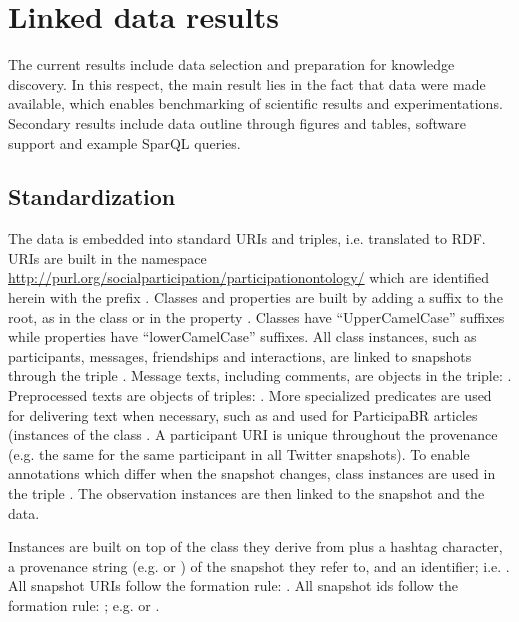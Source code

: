 \section{Linked data results}
\label{outline}
The current results include data selection and preparation for knowledge discovery.
In this respect, the main result lies in the fact that data were made available, which enables benchmarking of scientific results
and experimentations.
Secondary results include data outline through figures and tables,
software support and example SparQL queries.

\subsection{Standardization}
The data is embedded into standard URIs and triples, i.e. translated to RDF.
URIs are built in the namespace \url{http://purl.org/socialparticipation/participationontology/}
which are identified herein with the prefix .
Classes and properties are built by adding a suffix to the root,
as in the class  or in the property .
Classes have ``UpperCamelCase'' suffixes while properties have ``lowerCamelCase'' suffixes.
All class instances, such as participants, messages, friendships and
interactions, are linked to
snapshots through the triple .
Message texts, including comments, are objects in the triple: .
Preprocessed texts are objects of triples: .
More specialized predicates are used for delivering text when necessary,
such as  and  used
for ParticipaBR articles (instances of the class .
A participant URI is unique throughout the provenance (e.g. the same for
the same participant in all Twitter snapshots).
To enable annotations which differ when the snapshot changes,
 class instances are used in the triple
.
The observation instances are then linked to the snapshot and the
data.



Instances are built on top of the class they derive from plus a hashtag character,
a provenance string (e.g.  or
) of the snapshot they refer to, and an identifier;
i.e. .
All snapshot URIs follow the formation rule: .
All snapshot ids follow the formation rule: ; e.g.
 or
.
